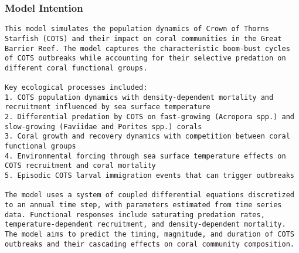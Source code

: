 \subsubsection{Model Intention}
\begin{lstlisting}
This model simulates the population dynamics of Crown of Thorns Starfish (COTS) and their impact on coral communities in the Great Barrier Reef. The model captures the characteristic boom-bust cycles of COTS outbreaks while accounting for their selective predation on different coral functional groups.

Key ecological processes included:
1. COTS population dynamics with density-dependent mortality and recruitment influenced by sea surface temperature
2. Differential predation by COTS on fast-growing (Acropora spp.) and slow-growing (Faviidae and Porites spp.) corals
3. Coral growth and recovery dynamics with competition between coral functional groups
4. Environmental forcing through sea surface temperature effects on COTS recruitment and coral mortality
5. Episodic COTS larval immigration events that can trigger outbreaks

The model uses a system of coupled differential equations discretized to an annual time step, with parameters estimated from time series data. Functional responses include saturating predation rates, temperature-dependent recruitment, and density-dependent mortality. The model aims to predict the timing, magnitude, and duration of COTS outbreaks and their cascading effects on coral community composition.
\end{lstlisting}

